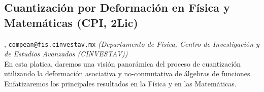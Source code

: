 \subsection{\sffamily Cuantizaci\'on por Deformaci\'on en F\'isica y Matem\'aticas {\footnotesize (CPI, 2Lic)}} \label{reg-1057} 
, {\tt compean@fis.cinvestav.mx}  {\slshape (Departamento de F\'isica, Centro de Investigaci\'on y de Estudios Avanzados (CINVESTAV))}\\
          \noindent En esta platica, daremos una visi\'on panor\'amica del proceso de cuantizaci\'on utilizando la deformaci\'on asociativa y no-conmutativa de \'algebras de funciones. Enfatizaremos los principales resultados en la F\'isica y en las Matem\'aticas.


